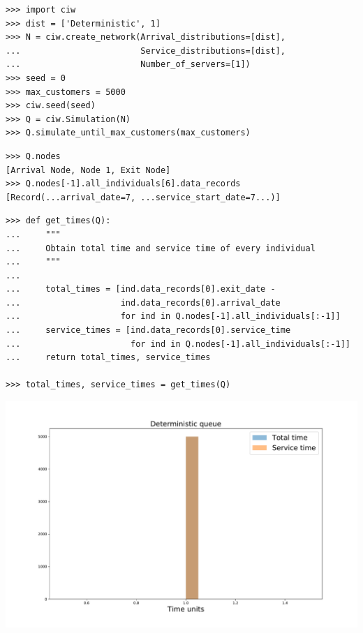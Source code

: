 \documentclass{beamer}
\begin{document}
    \begin{frame}[fragile]{}
        \begin{verbatim}
>>> import ciw
>>> dist = ['Deterministic', 1]
>>> N = ciw.create_network(Arrival_distributions=[dist],
...                        Service_distributions=[dist],
...                        Number_of_servers=[1])
>>> seed = 0
>>> max_customers = 5000
>>> ciw.seed(seed)
>>> Q = ciw.Simulation(N)
>>> Q.simulate_until_max_customers(max_customers)

        \end{verbatim}
\end{frame}

    \begin{frame}[fragile]{}
        \begin{verbatim}
>>> Q.nodes
[Arrival Node, Node 1, Exit Node]
>>> Q.nodes[-1].all_individuals[6].data_records
[Record(...arrival_date=7, ...service_start_date=7...)]

        \end{verbatim}
\end{frame}

    \begin{frame}[fragile]{}
        \begin{verbatim}
>>> def get_times(Q):
...     """
...     Obtain total time and service time of every individual
...     """
...
...     total_times = [ind.data_records[0].exit_date -
...                    ind.data_records[0].arrival_date
...                    for ind in Q.nodes[-1].all_individuals[:-1]]
...     service_times = [ind.data_records[0].service_time
...                      for ind in Q.nodes[-1].all_individuals[:-1]]
...     return total_times, service_times

>>> total_times, service_times = get_times(Q)

        \end{verbatim}
\end{frame}

\begin{frame}
    \begin{center}
        \includegraphics[width=\textwidth]{assets/deterministic_queue.pdf}
    \end{center}
\end{frame}
\end{document}

